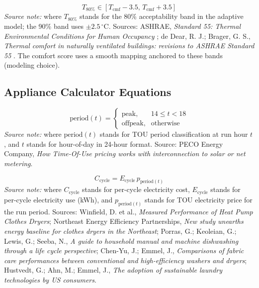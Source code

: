 \documentclass[12pt]{article}
\begin{document}
\begin{equation}
\label{eq:hvac_adaptive_band}
T_{\mathrm{80\%}} \in [T_{\mathrm{cmf}} - 3.5,\,T_{\mathrm{cmf}} + 3.5]
\end{equation}
\noindent\textit{Source note:} where $T_{\mathrm{80\%}}$ stands for the 80\% acceptability band in the adaptive model; the 90\% band uses $\pm 2.5\,^{\circ}\mathrm{C}$. Sources: ASHRAE, \emph{Standard 55: Thermal Environmental Conditions for Human Occupancy} \cite{ashrae55}; de Dear, R. J.; Brager, G. S., \emph{Thermal comfort in naturally ventilated buildings: revisions to ASHRAE Standard 55} \cite{dedear2002}. The comfort score uses a smooth mapping anchored to these bands (modeling choice).

\subsection{Appliance Calculator Equations}

\begin{equation}
\label{eq:app_tou_period}
\text{period}(t)=
\begin{cases}
\text{peak}, & 14\le t < 18\\
\text{offpeak}, & \text{otherwise}
\end{cases}
\end{equation}
\noindent\textit{Source note:} where $\text{period}(t)$ stands for TOU period classification at run hour $t$, and $t$ stands for hour-of-day in 24-hour format. Source: PECO Energy Company, \emph{How Time-Of-Use pricing works with interconnection to solar or net metering}.

\begin{equation}
\label{eq:app_cycle_cost}
C_{\mathrm{cycle}} = E_{\mathrm{cycle}}\,p_{\mathrm{period}(t)}
\end{equation}
\noindent\textit{Source note:} where $C_{\mathrm{cycle}}$ stands for per-cycle electricity cost, $E_{\mathrm{cycle}}$ stands for per-cycle electricity use (kWh), and $p_{\mathrm{period}(t)}$ stands for TOU electricity price for the run period. Sources: Winfield, D. et al., \emph{Measured Performance of Heat Pump Clothes Dryers}; Northeast Energy Efficiency Partnerships, \emph{New study unearths energy baseline for clothes dryers in the Northeast}; Porras, G.; Keoleian, G.; Lewis, G.; Seeba, N., \emph{A guide to household manual and machine dishwashing through a life cycle perspective}; Chen-Yu, J.; Emmel, J., \emph{Comparisons of fabric care performances between conventional and high-efficiency washers and dryers}; Hustvedt, G.; Ahn, M.; Emmel, J., \emph{The adoption of sustainable laundry technologies by US consumers}.
\end{document}
